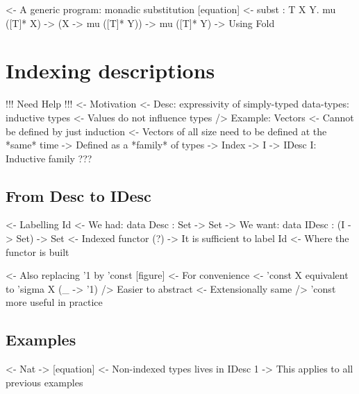 \documentclass{article}
\newenvironment{structure}{\footnotesize\verbatim}{\endverbatim}
\begin{document}
\begin{structure}
<- A generic program: monadic substitution [equation]
    <- subst : \forall T X Y. mu ([T]* X) -> (X -> mu ([T]* Y)) -> mu ([T]* Y)
    -> Using Fold
    
\end{structure}

\section{Indexing descriptions}

\begin{structure}
!!! Need Help !!!
<- Motivation
    <- Desc: expressivity of simply-typed data-types: inductive types
        <- Values do not influence types
    /> Example: Vectors
        <- Cannot be defined by just induction
            <- Vectors of all size need to be defined at the *same* time
            -> Defined as a *family* of types
                -> Index
        -> I -> IDesc I: Inductive family
    ???
\end{structure}

\subsection{From Desc to IDesc}

\begin{structure}
<- Labelling Id
    <- We had: data Desc : Set -> Set
    -> We want: data IDesc : (I -> Set) -> Set
        <- Indexed functor (?)
        -> It is sufficient to label Id
            <- Where the functor is built
\end{structure}

\begin{structure}
<- Also replacing '1 by 'const  [figure]
    <- For convenience
        <- 'const X equivalent to 'sigma X (\_ -> '1)
        /> Easier to abstract
            <- Extensionally same
            /> 'const more useful in practice
\end{structure}

\subsection{Examples}

\begin{structure}
<- Nat
    -> [equation]
    <- Non-indexed types lives in IDesc 1
        -> This applies to all previous examples
\end{structure}
\end{document}
